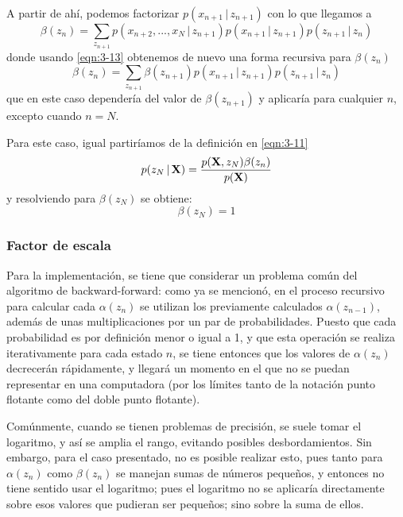 A partir de ahí, podemos factorizar $p(x_{n+1} \,|\, z_{n+1})$ con lo que llegamos a 
\begin{equation}  
  \beta(z_n) = \sum_{z_{n+1}} p(x_{n+2}, ..., x_N \,|\, z_{n+1}) 
    p(x_{n+1} \,|\, z_{n+1}) p(z_{n+1} \,|\, z_n)    
    \label{eqn:3-17}
\end{equation}
donde usando \eqref{eqn:3-13} obtenemos de nuevo una forma recursiva para $\beta(z_n)$
\begin{equation}  
  \beta(z_n) = \sum_{z_{n+1}} \beta(z_{n+1})
    p(x_{n+1} \,|\, z_{n+1}) p(z_{n+1} \,|\, z_n)    
    \label{eqn:3-18}
\end{equation}
que en este caso dependería del valor de $\beta(z_{n+1})$ y aplicaría para cualquier $n$, excepto cuando $n = N$. 

Para este caso, igual partiríamos de la definición en \eqref{eqn:3-11}
\begin{equation}
  p(z_N \,|\, \mathbf{X}) = \frac{p(\mathbf{X}, z_N) \beta(z_n)}{p(\bf{X})}
  \label{eqn:3-19}
\end{equation}
y resolviendo para $\beta(z_N)$ se obtiene:
\begin{equation}
  \beta(z_N) = 1
  \label{eqn:3-20}
\end{equation}

\subsubsection{Factor de escala}
\label{sec:escala}

Para la implementación, se tiene que considerar un problema común del algoritmo de backward-forward: como ya se mencionó, en el proceso recursivo para calcular cada $\alpha(z_n)$ se utilizan los previamente calculados $\alpha(z_{n-1})$, además de unas multiplicaciones por un par de probabilidades. Puesto que cada probabilidad es por definición menor o igual a 1, y que esta operación se realiza iterativamente para cada estado $n$, se tiene entonces que los valores de $\alpha(z_n)$ decrecerán rápidamente, y llegará un momento en el que no se puedan representar en una computadora (por los límites tanto de la notación punto flotante como del doble punto flotante).

Comúnmente, cuando se tienen problemas de precisión, se suele tomar el logaritmo, y así se amplia el rango, evitando posibles desbordamientos. Sin embargo, para el caso presentado, no es posible realizar esto, pues tanto para $\alpha(z_n)$ como $\beta(z_n)$ se manejan sumas de números pequeños, y entonces no tiene sentido usar el logaritmo; pues el logaritmo no se aplicaría directamente sobre esos valores que pudieran ser pequeños; sino sobre la suma de ellos.

